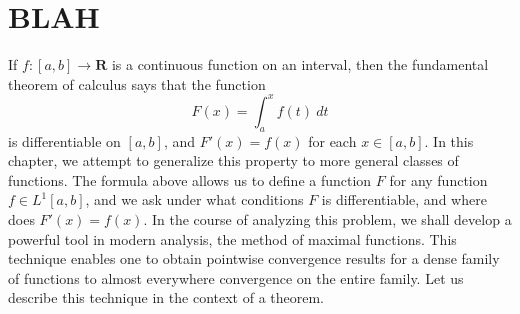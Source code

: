 \section{BLAH}

%
%

If $f: [a,b] \to \mathbf{R}$ is a continuous function on an interval, then the fundamental theorem of calculus says that the function
%
\[ F(x) = \int_a^x f(t)\ dt \]
%
is differentiable on $[a,b]$, and $F'(x) = f(x)$ for each $x \in [a,b]$. In this chapter, we attempt to generalize this property to more general classes of functions. The formula above allows us to define a function $F$ for any function $f \in L^1[a,b]$, and we ask under what conditions $F$ is differentiable, and where does $F'(x) = f(x)$. In the course of analyzing this problem, we shall develop a powerful tool in modern analysis, the method of maximal functions. This technique enables one to obtain pointwise convergence results for a dense family of functions to almost everywhere convergence on the entire family. Let us describe this technique in the context of a theorem.


